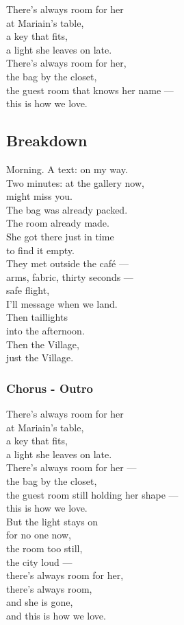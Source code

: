 There's always room for her\\
at Mariain's table,\\
a key that fits,\\
a light she leaves on late.\\
There's always room for her,\\
the bag by the closet,\\
the guest room that knows her name ---\\
this is how we love.

\subsection{Breakdown}\label{breakdown}

Morning. A text: on my way.\\
Two minutes: at the gallery now,\\
might miss you.\\
The bag was already packed.\\
The room already made.\\
She got there just in time\\
to find it empty.\\
They met outside the café ---\\
arms, fabric, thirty seconds ---\\
safe flight,\\
I'll message when we land.\\
Then taillights\\
into the afternoon.\\
Then the Village,\\
just the Village.

\subsubsection{Chorus - Outro}\label{chorus---outro-1}

There's always room for her\\
at Mariain's table,\\
a key that fits,\\
a light she leaves on late.\\
There's always room for her ---\\
the bag by the closet,\\
the guest room still holding her shape ---\\
this is how we love.\\
But the light stays on\\
for no one now,\\
the room too still,\\
the city loud ---\\
there's always room for her,\\
there's always room,\\
and she is gone,\\
and this is how we love.

